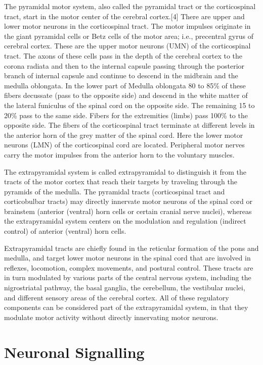 The pyramidal motor system, also called the pyramidal tract or the corticospinal tract, start in the motor center of the cerebral cortex.{[}4{]} There are upper and lower motor neurons in the corticospinal tract. The motor impulses originate in the giant pyramidal cells or Betz cells of the motor area; i.e., precentral gyrus of cerebral cortex. These are the upper motor neurons (UMN) of the corticospinal tract. The axons of these cells pass in the depth of the cerebral cortex to the corona radiata and then to the internal capsule passing through the posterior branch of internal capsule and continue to descend in the midbrain and the medulla oblongata. In the lower part of Medulla oblongata 80 to 85\% of these fibers decussate (pass to the opposite side) and descend in the white matter of the lateral funiculus of the spinal cord on the opposite side. The remaining 15 to 20\% pass to the same side. Fibers for the extremities (limbs) pass 100\% to the opposite side. The fibers of the corticospinal tract terminate at different levels in the anterior horn of the grey matter of the spinal cord. Here the lower motor neurons (LMN) of the corticospinal cord are located. Peripheral motor nerves carry the motor impulses from the anterior horn to the voluntary muscles.

The extrapyramidal system is called extrapyramidal to distinguish it from the tracts of the motor cortex that reach their targets by traveling through the pyramids of the medulla. The pyramidal tracts (corticospinal tract and corticobulbar tracts) may directly innervate motor neurons of the spinal cord or brainstem (anterior (ventral) horn cells or certain cranial nerve nuclei), whereas the extrapyramidal system centers on the modulation and regulation (indirect control) of anterior (ventral) horn cells.

Extrapyramidal tracts are chiefly found in the reticular formation of the pons and medulla, and target lower motor neurons in the spinal cord that are involved in reflexes, locomotion, complex movements, and postural control. These tracts are in turn modulated by various parts of the central nervous system, including the nigrostriatal pathway, the basal ganglia, the cerebellum, the vestibular nuclei, and different sensory areas of the cerebral cortex. All of these regulatory components can be considered part of the extrapyramidal system, in that they modulate motor activity without directly innervating motor neurons.

\hypertarget{neuronal-signalling}{%
\section{Neuronal Signalling}\label{neuronal-signalling}}

